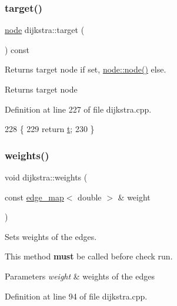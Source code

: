 \subsubsection{\texorpdfstring{target()}{target()}\hspace{0.1cm}{\footnotesize\ttfamily [2/2]}}
{\footnotesize\ttfamily \mbox{\hyperlink{classnode}{node}} dijkstra\+::target (\begin{DoxyParamCaption}{ }\end{DoxyParamCaption}) const}



Returns target node if set, {\ttfamily \mbox{\hyperlink{classnode_a6da4ea35f222059db9a59cf40be459f9}{node\+::node()}}} else. 

\begin{DoxyReturn}{Returns}
target node 
\end{DoxyReturn}


Definition at line 227 of file dijkstra.\+cpp.


\begin{DoxyCode}
228 \{
229     \textcolor{keywordflow}{return} \mbox{\hyperlink{classdijkstra_a6c42e614aabfbef25b5acfb543fbe1d1}{t}};
230 \}
\end{DoxyCode}
\mbox{\label{classdijkstra_a92f4394b757f6ffcb372535114a6cbf6}} 
\subsubsection{\texorpdfstring{weights()}{weights()}}
{\footnotesize\ttfamily void dijkstra\+::weights (\begin{DoxyParamCaption}\item[{const \mbox{\hyperlink{classedge__map}{edge\+\_\+map}}$<$ double $>$ \&}]{weight }\end{DoxyParamCaption})}



Sets weights of the edges. 

This method {\bfseries must} be called before check run.


\begin{DoxyParams}{Parameters}
{\em weight} & weights of the edges \\
\hline
\end{DoxyParams}


Definition at line 94 of file dijkstra.\+cpp.



